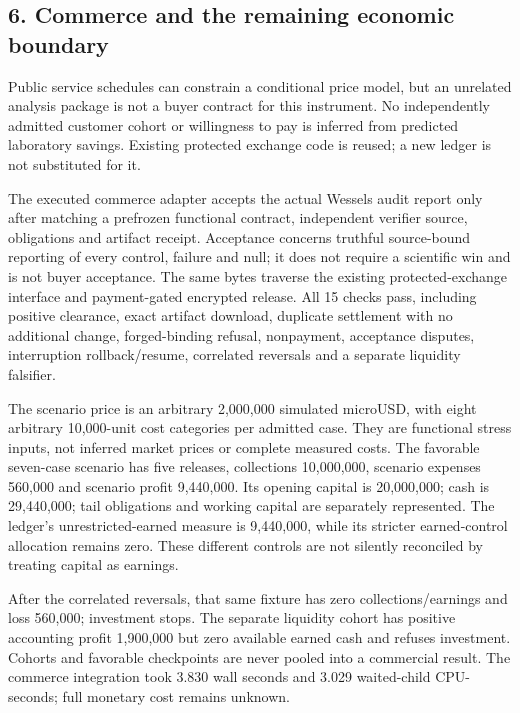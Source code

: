 \documentclass[
  10pt,
]{article}
\begin{document}
\hypertarget{commerce-and-the-remaining-economic-boundary}{%
\subsection{6. Commerce and the remaining economic
boundary}\label{commerce-and-the-remaining-economic-boundary}}

Public service schedules can constrain a conditional price model, but an
unrelated analysis package is not a buyer contract for this instrument.
No independently admitted customer cohort or willingness to pay is
inferred from predicted laboratory savings. Existing protected exchange
code is reused; a new ledger is not substituted for it.

The executed commerce adapter accepts the actual Wessels audit report
only after matching a prefrozen functional contract, independent
verifier source, obligations and artifact receipt. Acceptance concerns
truthful source-bound reporting of every control, failure and null; it
does not require a scientific win and is not buyer acceptance. The same
bytes traverse the existing protected-exchange interface and
payment-gated encrypted release. All 15 checks pass, including positive
clearance, exact artifact download, duplicate settlement with no
additional change, forged-binding refusal, nonpayment, acceptance
disputes, interruption rollback/resume, correlated reversals and a
separate liquidity falsifier.

The scenario price is an arbitrary 2,000,000 simulated microUSD, with
eight arbitrary 10,000-unit cost categories per admitted case. They are
functional stress inputs, not inferred market prices or complete
measured costs. The favorable seven-case scenario has five releases,
collections 10,000,000, scenario expenses 560,000 and scenario profit
9,440,000. Its opening capital is 20,000,000; cash is 29,440,000; tail
obligations and working capital are separately represented. The ledger's
unrestricted-earned measure is 9,440,000, while its stricter
earned-control allocation remains zero. These different controls are not
silently reconciled by treating capital as earnings.

After the correlated reversals, that same fixture has zero
collections/earnings and loss 560,000; investment stops. The separate
liquidity cohort has positive accounting profit 1,900,000 but zero
available earned cash and refuses investment. Cohorts and favorable
checkpoints are never pooled into a commercial result. The commerce
integration took 3.830 wall seconds and 3.029 waited-child CPU-seconds;
full monetary cost remains unknown.
\end{document}
